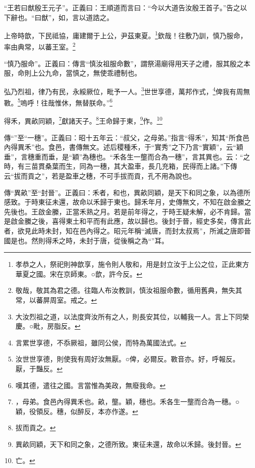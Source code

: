 {\noindent\shu{}\fzkt “王若曰猷殷王元子”。正義曰：王順道而言曰：“今以大道告汝殷王首子。”告之以下辭也。“曰猷”，如，言以道誥之。 \par}

上帝時歆，下民祗協，庸建爾于上公，尹茲東夏。\footnote{孝恭之人，祭祀則神歆享，施令則人敬和，用是封立汝于上公之位，正此東方華夏之國。宋在京師東。○歆，許今反。}欽哉！往敷乃訓，慎乃服命，率由典常，以蕃王室。\footnote{敬哉，敬其為君之德。往臨人布汝教訓，慎汝祖服命數，循用舊典，無失其常，以蕃屏周室。戒之。}

{\noindent\shu{}\fzkt “慎乃服命”。正義曰：傳言“慎汝祖服命數”，謂祭湯廟得用天子之禮，服其殷之本服，命則上公九命，當慎之，無使乖禮制也。 \par}

弘乃烈祖，律乃有民，永綏厥位，毗予一人。\footnote{大汝烈祖之道，以法度齊汝所有之人，則長安其位，以輔我一人。言上下同榮慶。○毗，房脂反。}世世享德，萬邦作式，\footnote{言累世享德，不忝厥祖，雖同公侯，而特為萬國法式。}俾我有周無斁。\footnote{汝世世享德，則使我有周好汝無厭。○俾，必爾反。斁音亦。好，呼報反。厭，于豔反。}嗚呼！往哉惟休，無替朕命。”\footnote{嘆其德，遣往之國。言當惟為美政，無廢我命。}

得禾，異畝同穎，\footnote{，母弟。食邑內得異禾也。畝，壟。穎，穗也。禾各生一壟而合為一穗。○穎，役領反。穗，似醉反，本亦作遂。}獻諸天子。\footnote{拔而貢之。}王命歸于東，\footnote{異畝同穎，天下和同之象，之德所致。東征未還，故命以禾歸。後封晉。}作。\footnote{亡。}


{\noindent\zhuan{}\fzbyks 傳“”至“一穗”。正義曰：昭十五年云：“叔父，之母弟。”指言“得禾”，知其“所食邑內得異禾”也。食邑，書傳無文。述后稷種禾，于“實秀”之下乃言“實穎”，云“穎垂”，言穗重而垂，是“穎”為穗也。“禾各生一壟而合為一穗”，言其異也。云：“之時，有三苗貫桑葉而生，同為一穗，其大盈車，長几充箱，民得而上諸。”下傳云“拔而貢之”，若是盈車之穗，不可手拔而貢，孔不用為說也。 \par}

{\noindent\zhuan{}\fzbyks 傳“異畝”至“封晉”。正義曰：禾者，和也，異畝同穎，是天下和同之象，以為德所感致。于時東征未還，故命以禾歸于東也。歸禾年月，史傳無文，不知在啟金縢之先後也。王啟金縢，正當禾熟之月。若是前年得之，于時王疑未解，必不肯歸。當是啟金縢之後，喜得東土和平而有此應，故以歸也。後封于晉，經史多矣，傳言此者，欲見此時未封，知在邑內得之。昭元年稱“滅唐，而封太叔焉”，所滅之唐即晉國是也。然則得禾之時，未封于唐，從後稱之為“”耳。 \par}

